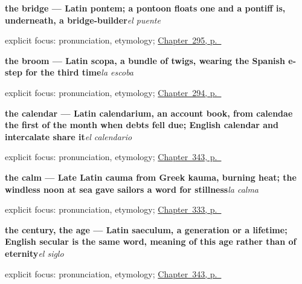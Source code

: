 \noindent\begin{minipage}[t]{\linewidth}
\raggedright
\textbf{the bridge — Latin pontem; a pontoon floats one and a pontiff is, underneath, a bridge-builder}\enspace\emph{el puente}\par
\footnotesize explicit focus: pronunciation, etymology; \hyperref[ch:el-sendero]{Chapter~295, p.~\pageref*{ch:el-sendero}}
\end{minipage}\par\smallskip

\noindent\begin{minipage}[t]{\linewidth}
\raggedright
\textbf{the broom — Latin scopa, a bundle of twigs, wearing the Spanish e- step for the third time}\enspace\emph{la escoba}\par
\footnotesize explicit focus: pronunciation, etymology; \hyperref[ch:cinco-cosas-mas]{Chapter~294, p.~\pageref*{ch:cinco-cosas-mas}}
\end{minipage}\par\smallskip

\noindent\begin{minipage}[t]{\linewidth}
\raggedright
\textbf{the calendar — Latin calendarium, an account book, from calendae the first of the month when debts fell due; English calendar and intercalate share it}\enspace\emph{el calendario}\par
\footnotesize explicit focus: pronunciation, etymology; \hyperref[ch:la-fecha-y-el-siglo]{Chapter~343, p.~\pageref*{ch:la-fecha-y-el-siglo}}
\end{minipage}\par\smallskip

\noindent\begin{minipage}[t]{\linewidth}
\raggedright
\textbf{the calm — Late Latin cauma from Greek kauma, burning heat; the windless noon at sea gave sailors a word for stillness}\enspace\emph{la calma}\par
\footnotesize explicit focus: pronunciation, etymology; \hyperref[ch:calma-y-prisa]{Chapter~333, p.~\pageref*{ch:calma-y-prisa}}
\end{minipage}\par\smallskip

\noindent\begin{minipage}[t]{\linewidth}
\raggedright
\textbf{the century, the age — Latin saeculum, a generation or a lifetime; English secular is the same word, meaning of this age rather than of eternity}\enspace\emph{el siglo}\par
\footnotesize explicit focus: pronunciation, etymology; \hyperref[ch:la-fecha-y-el-siglo]{Chapter~343, p.~\pageref*{ch:la-fecha-y-el-siglo}}
\end{minipage}\par\smallskip

